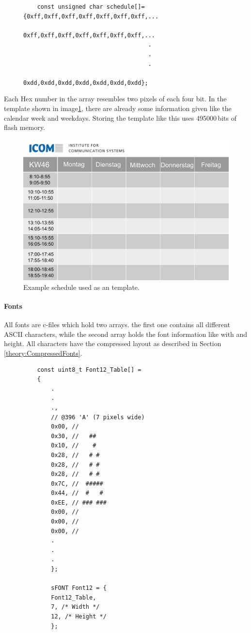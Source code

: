 \begin{figure}[H]
	\begin{lstlisting}
	const unsigned char schedule[]={0xff,0xff,0xff,0xff,0xff,0xff,0xff,...
									0xff,0xff,0xff,0xff,0xff,0xff,0xff,...
									.
									.
									.
									0xdd,0xdd,0xdd,0xdd,0xdd,0xdd,0xdd};
	\end{lstlisting}
\end{figure}
Each Hex number in the array resembles two pixels of each four bit. In the template shown in image\ref{software:kalender}, there are already some information given like the calendar week and weekdays. Storing the template like this uses 495000\,bits of flash memory. 
\begin{figure}[ht]
	\centering
	\includegraphics[height=0.6\textwidth]{4-development/software/graphics/Kalender.png}
	\caption{Example schedule used as an template.\label{software:kalender}}
\end{figure}


\paragraph{Fonts}
All fonts are c-files which hold two arrays. the first one contains all different ASCII characters, while the second array holds the font information like with and height. All characters have the compressed layout as described in Section \ref{theory:CompressedFonts}.
\begin{figure}[ht]
	\begin{lstlisting}
	const uint8_t Font12_Table[] = 
	{
		.
		.
		.,
		// @396 'A' (7 pixels wide)
		0x00, //        
		0x30, //   ##   
		0x10, //    #   
		0x28, //   # #  
		0x28, //   # #  
		0x28, //   # #  
		0x7C, //  ##### 
		0x44, //  #   # 
		0xEE, // ### ###
		0x00, //        
		0x00, //        
		0x00, // 
		.
		.
		. 
		};
		
		sFONT Font12 = {
		Font12_Table,
		7, /* Width */
		12, /* Height */
		};
	\end{lstlisting}
\end{figure}


